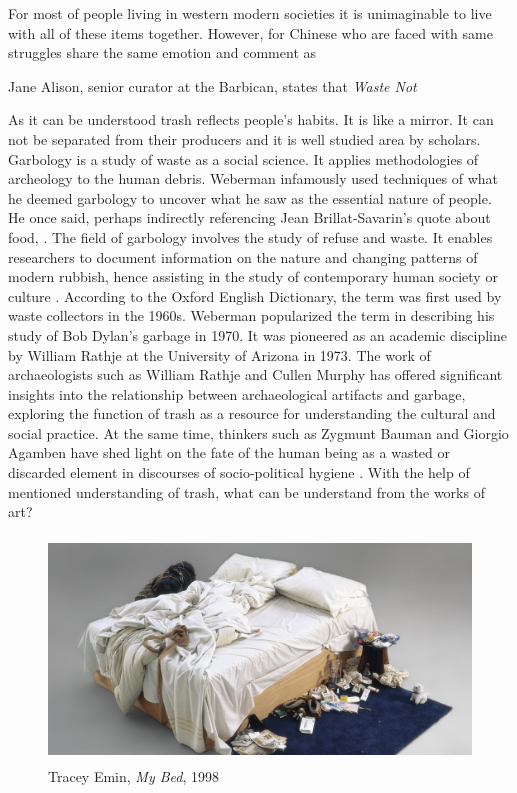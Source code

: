 For most of people living in western modern societies it is unimaginable to live with all of these items together. However, for Chinese who are faced with same struggles share the same emotion and comment as 

Jane Alison, senior curator at the Barbican, states that \textit{Waste Not}  \citep[as cited in][]{needham2015chinese}



As it can be understood trash reflects people's habits. It is like a mirror. It can not be separated from their producers and it is well studied area by scholars. Garbology is a study of waste as a social science. It applies methodologies of archeology to the human debris. Weberman infamously used techniques of what he deemed garbology to uncover what he saw as the essential nature of people. He once said, perhaps indirectly referencing Jean Brillat-Savarin’s quote about food,  \citep[as cited in][301]{lukas2012garbage}. The field of garbology involves the study of refuse and waste. It enables researchers to document information on the nature and changing patterns of modern rubbish, hence assisting in the study of contemporary human society or culture \citep{roy2012garbology}. According to the Oxford English Dictionary, the term was first used by waste collectors in the 1960s. Weberman popularized the term in describing his study of Bob Dylan’s garbage in 1970. It was pioneered as an academic discipline by William Rathje at the University of Arizona in 1973. The work of archaeologists such as William Rathje and Cullen Murphy has offered significant insights into the relationship between archaeological artifacts and garbage, exploring the function of trash as a resource for understanding the cultural and social practice. At the same time, thinkers such as Zygmunt Bauman and Giorgio Agamben have shed light on the fate of the human being as a wasted or discarded element in discourses of socio-political hygiene \citep{pye2010trashculture}. With the help of mentioned understanding of trash, what can be understand from the works of art?

\begin{figure}[h!]
  \centering
  \includegraphics[height=6cm]{graphics/tracey-emin-my-bed.jpg}
  \caption{Tracey Emin, \textit{My Bed}, 1998}
  \label{fig:TraceyEmin_MyBed}
\end{figure}

